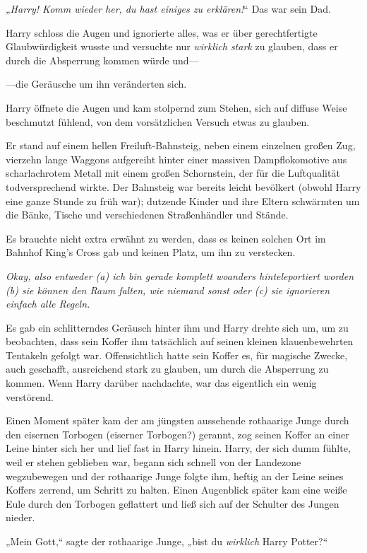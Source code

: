 {„\emph{Harry! Komm wieder her, du hast einiges zu erklären!}“ Das war sein Dad.

Harry schloss die Augen und ignorierte alles, was er über gerechtfertigte Glaubwürdigkeit wusste und versuchte nur \emph{wirklich stark} zu glauben, dass er durch die Absperrung kommen würde und—

—die Geräusche um ihn veränderten sich.

Harry öffnete die Augen und kam stolpernd zum Stehen, sich auf diffuse Weise beschmutzt fühlend, von dem vorsätzlichen Versuch etwas zu glauben.

Er stand auf einem hellen Freiluft-Bahnsteig, neben einem einzelnen großen Zug, vierzehn lange Waggons aufgereiht hinter einer massiven Dampflokomotive aus scharlachrotem Metall mit einem großen Schornstein, der für die Luftqualität todversprechend wirkte. Der Bahnsteig war bereits leicht bevölkert (obwohl Harry eine ganze Stunde zu früh war); dutzende Kinder und ihre Eltern schwärmten um die Bänke, Tische und verschiedenen Straßenhändler und Stände.

Es brauchte nicht extra erwähnt zu werden, dass es keinen solchen Ort im Bahnhof King's Cross gab und keinen Platz, um ihn zu verstecken.

\emph{Okay, also entweder (a) ich bin gerade komplett woanders hinteleportiert worden (b) sie können den Raum falten, wie niemand sonst oder (c) sie ignorieren einfach alle Regeln.}

Es gab ein schlitterndes Geräusch hinter ihm und Harry drehte sich um, um zu beobachten, dass sein Koffer ihm tatsächlich auf seinen kleinen klauenbewehrten Tentakeln gefolgt war. Offensichtlich hatte sein Koffer es, für magische Zwecke, auch geschafft, ausreichend stark zu glauben, um durch die Absperrung zu kommen. Wenn Harry darüber nachdachte, war das eigentlich ein wenig verstörend.

Einen Moment später kam der am jüngsten aussehende rothaarige Junge durch den eisernen Torbogen (eiserner Torbogen?) gerannt, zog seinen Koffer an einer Leine hinter sich her und lief fast in Harry hinein. Harry, der sich dumm fühlte, weil er stehen geblieben war, begann sich schnell von der Landezone wegzubewegen und der rothaarige Junge folgte ihm, heftig an der Leine seines Koffers zerrend, um Schritt zu halten. Einen Augenblick später kam eine weiße Eule durch den Torbogen geflattert und ließ sich auf der Schulter des Jungen nieder.

„Mein Gott,“ sagte der rothaarige Junge, „bist du \emph{wirklich} Harry Potter?“

}
